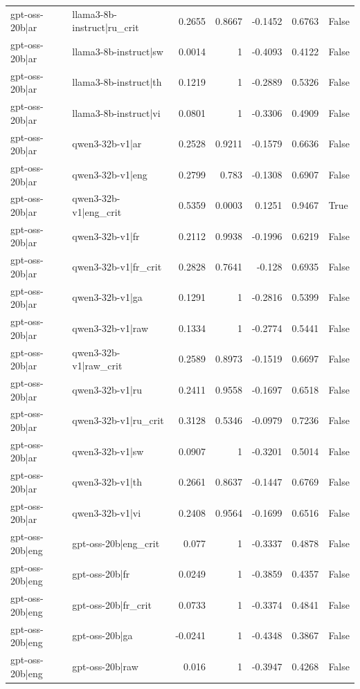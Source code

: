 \begin{table}
\begin{tabular}{l l r r r r l}
gpt-oss-20b|ar & llama3-8b-instruct|ru_crit & 0.2655 & 0.8667 & -0.1452 & 0.6763 & False \\
gpt-oss-20b|ar & llama3-8b-instruct|sw & 0.0014 & 1 & -0.4093 & 0.4122 & False \\
gpt-oss-20b|ar & llama3-8b-instruct|th & 0.1219 & 1 & -0.2889 & 0.5326 & False \\
gpt-oss-20b|ar & llama3-8b-instruct|vi & 0.0801 & 1 & -0.3306 & 0.4909 & False \\
gpt-oss-20b|ar & qwen3-32b-v1|ar & 0.2528 & 0.9211 & -0.1579 & 0.6636 & False \\
gpt-oss-20b|ar & qwen3-32b-v1|eng & 0.2799 & 0.783 & -0.1308 & 0.6907 & False \\
gpt-oss-20b|ar & qwen3-32b-v1|eng_crit & 0.5359 & 0.0003 & 0.1251 & 0.9467 & True \\
gpt-oss-20b|ar & qwen3-32b-v1|fr & 0.2112 & 0.9938 & -0.1996 & 0.6219 & False \\
gpt-oss-20b|ar & qwen3-32b-v1|fr_crit & 0.2828 & 0.7641 & -0.128 & 0.6935 & False \\
gpt-oss-20b|ar & qwen3-32b-v1|ga & 0.1291 & 1 & -0.2816 & 0.5399 & False \\
gpt-oss-20b|ar & qwen3-32b-v1|raw & 0.1334 & 1 & -0.2774 & 0.5441 & False \\
gpt-oss-20b|ar & qwen3-32b-v1|raw_crit & 0.2589 & 0.8973 & -0.1519 & 0.6697 & False \\
gpt-oss-20b|ar & qwen3-32b-v1|ru & 0.2411 & 0.9558 & -0.1697 & 0.6518 & False \\
gpt-oss-20b|ar & qwen3-32b-v1|ru_crit & 0.3128 & 0.5346 & -0.0979 & 0.7236 & False \\
gpt-oss-20b|ar & qwen3-32b-v1|sw & 0.0907 & 1 & -0.3201 & 0.5014 & False \\
gpt-oss-20b|ar & qwen3-32b-v1|th & 0.2661 & 0.8637 & -0.1447 & 0.6769 & False \\
gpt-oss-20b|ar & qwen3-32b-v1|vi & 0.2408 & 0.9564 & -0.1699 & 0.6516 & False \\
gpt-oss-20b|eng & gpt-oss-20b|eng_crit & 0.077 & 1 & -0.3337 & 0.4878 & False \\
gpt-oss-20b|eng & gpt-oss-20b|fr & 0.0249 & 1 & -0.3859 & 0.4357 & False \\
gpt-oss-20b|eng & gpt-oss-20b|fr_crit & 0.0733 & 1 & -0.3374 & 0.4841 & False \\
gpt-oss-20b|eng & gpt-oss-20b|ga & -0.0241 & 1 & -0.4348 & 0.3867 & False \\
gpt-oss-20b|eng & gpt-oss-20b|raw & 0.016 & 1 & -0.3947 & 0.4268 & False \\

\end{tabular}
\end{table}
